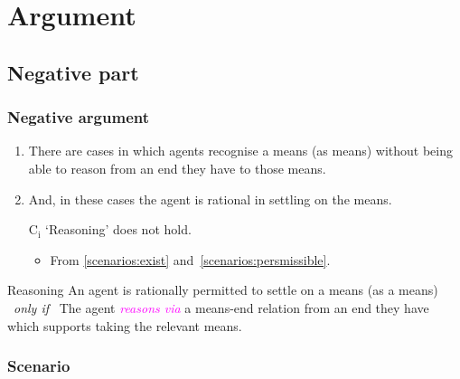 \documentclass[noamssymb, compress, handout]{beamer} %
\newcommand{\hozlinedash}[0]{%
  \noindent\hdashrule[0.5ex][c]{\textwidth}{.1pt}{2.5pt}
}
\begin{document}
\section{Argument}
\label{sec:argument}


\subsection{Negative part}
\label{sec:negative}

\begin{frame}
  \frametitle{Negative argument}

  \begin{enumerate}
  \item\label{scenarios:exist} There are cases in which agents recognise a means (as means) without being able to reason from an end they have to those means.
  \item\label{scenarios:persmissible} And, in these cases the agent is rational in settling on the means.

  \item[C\(_{\text{i}}\)] `Reasoning' does not hold.
    \begin{itemize}
    \item From \ref{scenarios:exist} and~\ref{scenarios:persmissible}.
    \end{itemize}
  \end{enumerate}

  \hozlinedash
  {\footnotesize
    \begin{block}{Reasoning}
      An agent is rationally permitted to settle on a means (as a means)
      \newline
      \mbox{ }\hfill\emph{only if}\hfill\mbox{ }
      \newline
      The agent \textcolor{fuchsia}{\emph{reasons via}}  a means-end relation from an end they have which supports taking the relevant means.
    \end{block}
  }
\end{frame}

\subsubsection{Scenario}
\label{sec:case}
\end{document}
